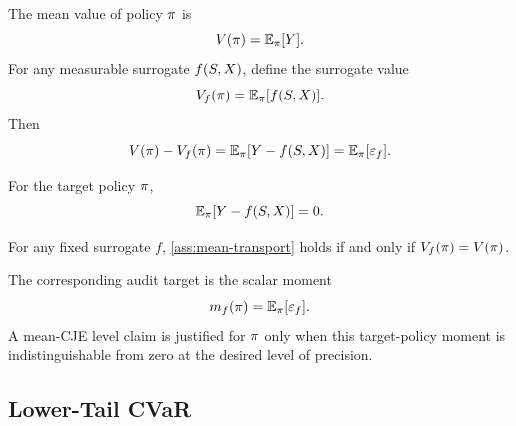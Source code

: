 The mean value of policy $\pi$ is
\begin{equation}
V(\pi)=\mathbb{E}_\pi[Y].
\end{equation}
For any measurable surrogate $f(S,X)$, define the surrogate value
\begin{equation}
V_f(\pi)=\mathbb{E}_\pi[f(S,X)].
\end{equation}
Then
\begin{equation}
V(\pi)-V_f(\pi)
=\mathbb{E}_\pi[Y-f(S,X)]
=\mathbb{E}_\pi[\varepsilon_f].
\label{eq:mean-transport-identity}
\end{equation}

\begin{assumption}
\label{ass:mean-transport}
For the target policy $\pi$,
\begin{equation}
\mathbb{E}_\pi[Y-f(S,X)]=0.
\end{equation}
\end{assumption}

\begin{proposition}
\label{prop:formal-mean-identification}
For any fixed surrogate $f$, \cref{ass:mean-transport} holds if and only if
$V_f(\pi)=V(\pi)$.
\end{proposition}

\begin{twocolproof}
\end{twocolproof}

The corresponding audit target is the scalar moment
\[
m_f(\pi)=\mathbb{E}_\pi[\varepsilon_f].
\]
A mean-CJE level claim is justified for $\pi$ only when this target-policy
moment is indistinguishable from zero at the desired level of precision.

\subsection{Lower-Tail CVaR}

